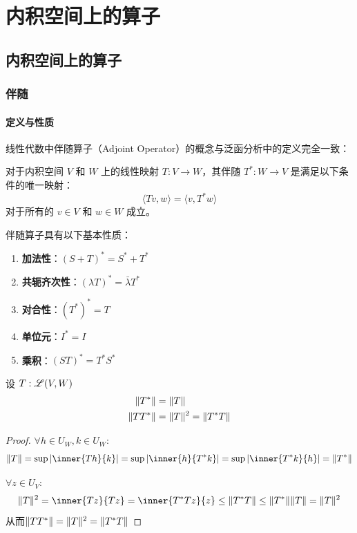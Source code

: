 \chapter{内积空间上的算子}
\section{内积空间上的算子}
\subsection{伴随}

\subsubsection{定义与性质}
线性代数中伴随算子（Adjoint Operator）的概念与泛函分析中的定义完全一致：

\begin{definition}[伴随]
    对于内积空间 \(V\) 和 \(W\)
    上的线性映射 \(T: V \to W\)，其伴随 \(T^*: W \to V\) 是满足以下条件的唯一映射：
    \[
        \langle Tv, w \rangle = \langle v, T^*w \rangle
    \]
    对于所有的 \(v \in V\) 和 \(w \in W\) 成立。
\end{definition}

伴随算子具有以下基本性质：
\begin{enumerate}
    \item \textbf{加法性}：\((S+T)^* = S^* + T^*\)
    \item \textbf{共轭齐次性}：\((\lambda T)^* = \bar{\lambda} T^*\)
    \item \textbf{对合性}：\((T^*)^* = T\)
    \item \textbf{单位元}：\(I^* = I\)
    \item \textbf{乘积}：\((ST)^* = T^*S^*\)
\end{enumerate}

\begin{theorem}
    设 \(T: \mathscr{L}(V, W)\)
    \begin{align*}
        \lVert T^*\rVert &= \lVert T\rVert \\
        \lVert TT^*\rVert &= \lVert T\rVert^2 = \lVert T^*T\rVert
    \end{align*}
\end{theorem}

\begin{proof}
    \(\forall h \in U_{W}, k \in U_{W}\):
    \[
        \norm{T} = \sup \abs{\inner{Th}{k}} = \sup
        \abs{\inner{h}{T^*k}} = \sup \abs{\inner{T^*k}{h}} = \norm{T^*}
    \]

    \(\forall z \in U_{V}\):
    \[
        \norm{T}^2 = \inner{Tz}{Tz} = \inner{T^*Tz}{z} \leq
        \norm{T^*T} \leq \norm{T^*}\norm{T} = \norm{T}^2
    \]
    从而\(\lVert TT^*\rVert = \lVert T\rVert^2 = \lVert T^*T\rVert\)
\end{proof}

